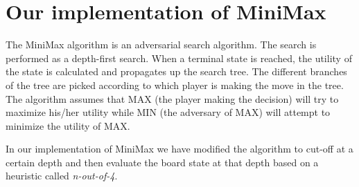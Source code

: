 \section{Our implementation of MiniMax}
\label{Our_Version}
The MiniMax algorithm is an adversarial search algorithm. The search is performed as a depth-first search. When a terminal state is reached, the utility of the state is calculated and propagates up the search tree. The different branches of the tree are picked according to which player is making the move in the tree. The algorithm assumes that MAX (the player making the decision) will try to maximize his/her utility while MIN (the adversary of MAX) will attempt to minimize the utility of MAX.

In our implementation of MiniMax we have modified the algorithm to cut-off at a certain depth and then evaluate the board state at that depth based on a heuristic called \textit{n-out-of-4}.